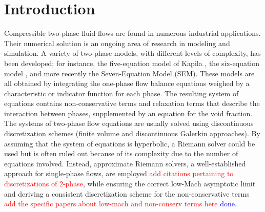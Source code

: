 \documentclass[preprint,10pt]{elsarticle}
\newcommand{\tcr}[1]{\textcolor{red}{#1}}
\newcommand{\tcb}[1]{\textcolor{blue}{#1}}
\begin{document}
\linenumbers

\section{Introduction}\label{sec:intro}
%
Compressible two-phase fluid flows are found in numerous industrial applications. Their numerical solution is an ongoing area of research in modeling and simulation. A variety of two-phase models, with different levels of complexity, has been developed; for instance, the five-equation model of Kapila \cite{Kapila_2001}, the six-equation model \cite{Toumi_1996}, and more recently the Seven-Equation Model  (SEM)\cite{SEM}. These models are all obtained by integrating the one-phase flow balance equations weighed by a characteristic or indicator function for each phase. The resulting system of equations contains non-conservative terms and relaxation terms that describe the interaction between phases, supplemented by an equation for the void fraction. 
The systems of two-phase flow equations are usually solved using discontinuous discretization schemes (finite volume and discontinuous Galerkin approaches). By assuming that the system of equations is hyperbolic, a Riemann solver could be used but is often ruled out because of its complexity due to the number of equations involved. Instead, approximate Riemann solvers, a well-established approach for single-phase flows, are employed \cite{Saurel_2001a, Saurel_2001b, Li_2004, Zein_2010, Ambroso_2012}\tcr{add citations pertaining to discretizations of 2-phase},  while ensuring the correct low-Mach asymptotic limit and deriving a consistent discretization scheme for the non-conservative terms \tcr{add the specific papers about low-mach and non-conserv terms here} \cite{Li_2004, Abgrall_2002} \tcb{done}.
\end{document}
